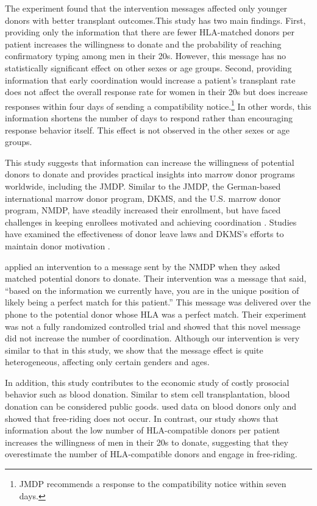 \documentclass[12pt, a4paper]{article}
\begin{document}
The experiment found that the intervention messages affected only younger donors with better transplant outcomes.This study has two main findings. First, providing only the information that there are fewer HLA-matched donors per patient increases the willingness to donate and the probability of reaching confirmatory typing among men in their 20s. However, this message has no statistically significant effect on other sexes or age groups. Second, providing information that early coordination would increase a patient's transplant rate does not affect the overall response rate for women in their 20s but does increase responses within four days of sending a compatibility notice.\footnote{JMDP recommends a response to the compatibility notice within seven days.} In other words, this information shortens the number of days to respond rather than encouraging response behavior itself. This effect is not observed in the other sexes or age groups.

This study suggests that information can increase the willingness of potential donors to donate and provides practical insights into marrow donor programs worldwide, including the JMDP. Similar to the JMDP, the German-based international marrow donor program, DKMS, and the U.S. marrow donor program, NMDP, have steadily increased their enrollment, but have faced challenges in keeping enrollees motivated and achieving coordination \citep{Switzer1999, Switzer2004, Haylock2022}. Studies have examined the effectiveness of donor leave laws \citep{Lacetera2014} and DKMS's efforts to maintain donor motivation \citep{Haylock2022}.

\citet{Switzer2018} applied an intervention to a message sent by the NMDP when they asked matched potential donors to donate. Their intervention was a message that said, ``based on the information we currently have, you are in the unique position of likely being a perfect match for this patient.'' This message was delivered over the phone to the potential donor whose HLA was a perfect match. Their experiment was not a fully randomized controlled trial and showed that this novel message did not increase the number of coordination. Although our intervention is very similar to that in this study, we show that the message effect is quite heterogeneous, affecting only certain genders and ages.

In addition, this study contributes to the economic study of costly prosocial behavior such as blood donation. Similar to stem cell transplantation, blood donation can be considered public goods. \citet{Wildman2009} used data on blood donors only and showed that free-riding does not occur. In contrast, our study shows that information about the low number of HLA-compatible donors per patient increases the willingness of men in their 20s to donate, suggesting that they overestimate the number of HLA-compatible donors and engage in free-riding.
\end{document}
